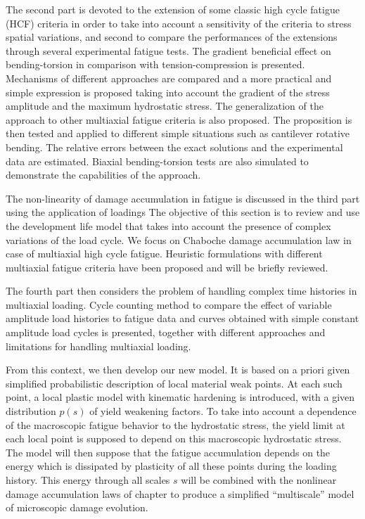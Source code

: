 The second part is devoted to the extension of some classic high cycle fatigue (HCF) criteria in order  to take into account a sensitivity of the criteria to stress spatial variations, and second to compare the performances of the extensions through several experimental fatigue tests. The gradient beneficial effect on bending-torsion in comparison with tension-compression is presented. Mechanisms of different approaches are compared and a more practical and simple expression is proposed taking into account the gradient of the stress amplitude and the maximum hydrostatic stress. The generalization of the approach to other multiaxial fatigue criteria is also proposed.  The proposition is then tested and applied to different simple situations such as cantilever rotative bending. The relative errors between the exact solutions and the experimental data are estimated. Biaxial  bending-torsion tests are also simulated to demonstrate the capabilities of the approach. 

The non-linearity of damage accumulation in fatigue is discussed in the third part using the application of loadings
The objective of this section is to review and use the development life model that takes into account the presence of complex variations of the load cycle. We focus on Chaboche damage accumulation law in case of multiaxial high cycle fatigue. Heuristic formulations with different multiaxial fatigue criteria have been proposed and will be briefly reviewed.

The fourth part then considers the problem of handling complex time histories in multiaxial loading. 
Cycle counting method to compare the effect of variable amplitude load histories to fatigue data and curves obtained with simple constant amplitude load cycles is presented, together with different approaches and limitations for handling multiaxial loading.

From this context, we then develop our new model. It is based on a priori given simplified probabilistic description of local material weak points. At each such point, a local plastic model with kinematic hardening is introduced, with a given distribution $p(s)$ of yield weakening factors. To take into account a dependence of the macroscopic fatigue behavior to the hydrostatic stress, the yield limit at each local point is supposed to depend on this macroscopic hydrostatic stress. The model will then suppose that the fatigue accumulation depends on the energy which is dissipated by plasticity of all these points during the loading history.  This energy through all scales $s$ will be combined with the nonlinear damage accumulation laws of chapter\cite{chp:4} to produce a simplified ``multiscale'' model of microscopic damage evolution.

